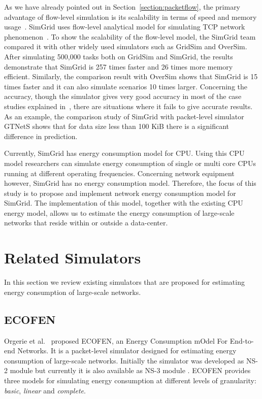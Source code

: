 As we have already pointed out in Section~\ref{section:packetflow}, the primary advantage of flow-level simulation is its scalability in terms of speed and memory usage~\cite{DBLP:conf/ccgrid/QuinsonRT12}. SimGrid uses flow-level analytical model for simulating TCP network phenomenon~\cite{DBLP:journals/jpdc/CasanovaGLQS14}. To show the scalability of the flow-level model, the SimGrid team compared it with other widely used simulators such as GridSim and OverSim. After simulating 500,000 tasks both on GridSim and SimGrid, the results demonstrate that SimGrid is 257 times faster and 26 times more memory efficient. Similarly, the comparison result with OverSim shows that SimGrid is 15 times faster and it can also simulate scenarios 10 times larger. Concerning the accuracy, though the simulator gives very good accuracy in most of the case studies explained in~\cite{DBLP:journals/jpdc/CasanovaGLQS14}, there are situations where it fails to give accurate results. As an example, the comparison study of SimGrid with packet-level simulator GTNetS shows that for data size less than 100 KiB there is a significant difference in prediction. 

Currently, SimGrid has energy consumption model for CPU. Using this CPU model researchers can simulate energy consumption of single or multi core CPUs running at different operating frequencies. Concerning network equipment however, SimGrid has no energy consumption model. Therefore, the focus of this study is to propose and implement network energy consumption model for SimGrid. The implementation of this model, together with the existing CPU energy model, allows us to estimate the energy consumption of large-scale networks that reside within or outside a data-center.

\section{Related Simulators}
\label{section:relatedsimulator} 
In this section we review existing simulators that are proposed for estimating energy consumption of large-scale networks. 
\subsection{ECOFEN}
\label{subsection:ecofen} 
Orgerie et al.~\cite{DBLP:conf/wowmom/OrgerieLLL11} proposed ECOFEN, an Energy Consumption
mOdel For End-to-end Networks. It is a packet-level simulator designed for estimating energy consumption of large-scale networks. Initially the simulator was developed as NS-2 module but currently it is also available as NS-3 module \cite{DBLP:conf/cloudnet/CorneaOL14}. ECOFEN provides three models for simulating energy consumption at different levels of granularity: \emph{basic}, \emph{linear} and \emph{complete}.

